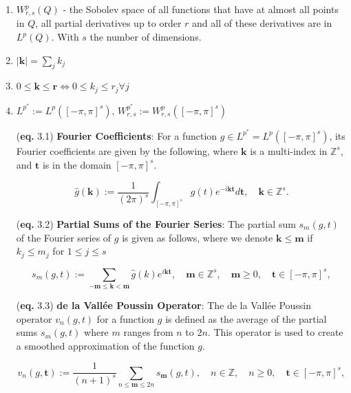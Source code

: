 \documentclass{article}
\begin{document}
\begin{enumerate}
    \item \(W^{p}_{r,s} (Q)\) - the Sobolev space of all functions that have at almost all points in \(Q\), all partial derivatives up to order \(r\) and all of these derivatives are in \(L^p(Q)\). With \(s\) the number of dimensions.
    \item \(\left\vert \mathbf{k}  \right\vert = \sum_{j} k_{j}\)
    \item  \(0 \leq \mathbf{k} \leq \mathbf{r}  \iff 0 \leq k_{j}\leq r_{j} \forall j\) 
    \item \(L^{p^{\ast} } := L^{p}([-\pi ,\pi ]^s) \), \(W^{p^{\ast} }_{r,s} := W^{p}_{r,s} ([-\pi ,\pi ]^s)\) 

    \item[(\textbf{eq.} 3.1)] \textbf{Fourier Coefficients}: For a function \( g \in L^{p^*} = L^{p}([-\pi ,\pi ]^s) \), its Fourier coefficients are given by the following, where \( \mathbf{k} \) is a multi-index in \( \mathbb{Z}^s \), and \( \mathbf{t}  \) is in the domain \( [-\pi, \pi]^s \).

    \[
      \hat{g}(\mathbf{k}) := \frac{1}{(2\pi)^s} \int_{[-\pi,\pi]^s} g(t)e^{-i \mathbf{kt}} d \mathbf{t}, \quad \mathbf{k} \in \mathbb{Z}^s.  
    \]


    \item[(\textbf{eq.} 3.2)]\textbf{Partial Sums of the Fourier Series}: The partial sum \( s_m(g, t) \) of the Fourier series of \( g \) is given as follows, where we denote \(\mathbf{k} \leq \mathbf{m} \) if \(k_{j} \leq m_{j}\) for \( 1 \leq  j \leq s\) 
    
    \[
        s_m(g,t) := \sum_{-\mathbf{m} \leq \mathbf{k} < \mathbf{m}} \hat{g}(k)e^{i \mathbf{kt}}, \quad \mathbf{m}  \in \mathbb{Z}^s, \quad \mathbf{m}  \geq 0, \quad \mathbf{t} \in [-\pi, \pi]^s,
    \]

    \item[(\textbf{eq.} 3.3)]\textbf{de la Vallée Poussin Operator}: The de la Vallée Poussin operator \( v_n(g, t) \) for a function \( g \) is defined as the average of the partial sums \( s_m(g, t) \) where \( m \) ranges from \( n \) to \( 2n \). This operator is used to create a smoothed approximation of the function \( g \).
    
    \[
        v_n(g,\mathbf{t} ) := \frac{1}{(n+1)^s} \sum_{n \leq \mathbf{m} \leq 2n} s_{\mathbf{m}}(g,t), \quad n \in \mathbb{Z}, \quad n \geq 0, \quad \mathbf{t} \in [-\pi, \pi]^s,
    \]


\end{enumerate}
\end{document}
